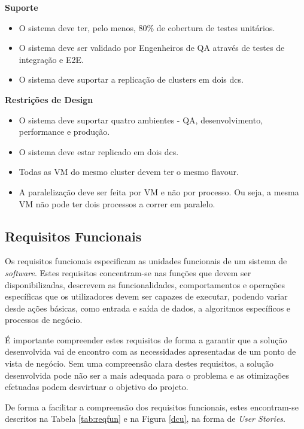 \textbf{Suporte}
\begin{itemize}
  \item O sistema deve ter, pelo menos, 80\% de cobertura de testes unitários.
  \item O sistema deve ser validado por Engenheiros de \ac{QA} através de testes de integração e \ac{E2E}.
  \item O sistema deve suportar a replicação de \glspl{cluster} em dois \glspl{dc}.
\end{itemize}

\textbf{Restrições de Design}
\begin{itemize}
  \item O sistema deve suportar quatro ambientes - \ac{QA}, desenvolvimento, 
    performance e produção.
  \item O sistema deve estar replicado em dois \glspl{dc}.
  \item Todas as \ac{VM} do mesmo \gls{cluster} devem ter o mesmo \gls{flavour}.
  \item A paralelização deve ser feita por \ac{VM} e não por processo. Ou seja, a mesma \ac{VM} 
    não pode ter dois processos a correr em paralelo.
\end{itemize}

\subsection{Requisitos Funcionais}
\label{sec:3-rf}

Os requisitos funcionais especificam as unidades funcionais de um sistema de \textit{software}.
Estes requisitos concentram-se nas funções que devem ser disponibilizadas, descrevem as
funcionalidades, comportamentos e operações específicas que os utilizadores devem ser capazes de 
executar, podendo variar desde ações básicas, como entrada e saída de dados, a algoritmos 
específicos e processos de negócio.

É importante compreender estes requisitos de forma a garantir que a solução desenvolvida vai de
encontro com as necessidades apresentadas de um ponto de vista de negócio. Sem uma compreensão
clara destes requisitos, a solução desenvolvida pode não ser a mais adequada para o problema
e as otimizações efetuadas podem desvirtuar o objetivo do projeto.

De forma a facilitar a compreensão dos requisitos funcionais, estes encontram-se descritos na 
Tabela \ref{tab:reqfun} e na Figura \ref{dcu}, na forma de \textit{User Stories}.

